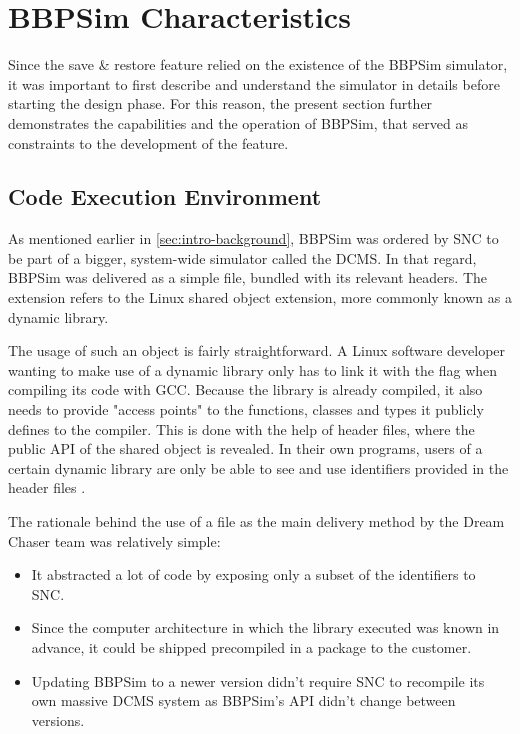 {\section{BBPSim Characteristics}\label{sec:bbpsim-charact}
Since the save \& restore feature relied on the existence of the \gls{BBPSim} simulator, it was important to first describe and understand the simulator in details before starting the design phase. For this reason, the present section further demonstrates the capabilities and the operation of \gls{BBPSim}, that served as constraints to the development of the feature.

\subsection*{Code Execution Environment}
As mentioned earlier in \autoref{sec:intro-background}, \gls{BBPSim} was ordered by \gls{SNC} to be part of a bigger, system-wide simulator called the \gls{DCMS}. In that regard, \gls{BBPSim} was delivered as a simple  file, bundled with its relevant headers. The  extension refers to the Linux shared object extension, more commonly known as a dynamic library. 

The usage of such an object is fairly straightforward. A Linux software developer wanting to make use of a dynamic library only has to link it with the  flag when compiling its code with GCC. Because the library is already compiled, it also needs to provide "access points" to the functions, classes and types it publicly defines to the compiler. This is done with the help of header files, where the public API of the shared object is revealed. In their own programs, users of a certain dynamic library are only be able to see and use identifiers provided in the header files .

The rationale behind the use of a  file as the main delivery method by the Dream Chaser team was relatively simple:
\begin{itemize}
	\item It abstracted a lot of code by exposing only a subset of the identifiers to \gls{SNC}.
	\item Since the computer architecture in which the library executed was known in advance, it could be shipped precompiled in a package to the customer.
	\item Updating \gls{BBPSim} to a newer version didn't require \gls{SNC} to recompile its own massive \gls{DCMS} system as \gls{BBPSim}'s API didn't change between versions. 
\end{itemize}

}

